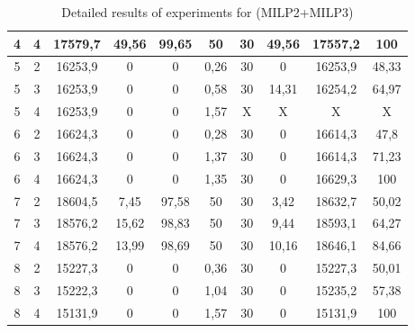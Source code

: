 \begin{table}[!ht]
\begin{tabular}{|c|c|cccc|cccc|}
\rule[-7pt]{0pt}{15pt} 
4	&	4	&	17579,7	&	49,56	&	99,65	&	50	&	30	&	49,56	&	17557,2	&	100	\\
      \hline
\rule[-7pt]{0pt}{15pt} 
5	&	2	&	16253,9	&	0	&	0	&	0,26	&	30	&	0	&	16253,9	&	48,33	\\
\rule[-7pt]{0pt}{15pt} 
5	&	3	&	16253,9	&	0	&	0	&	0,58	&	30	&	14,31	&	16254,2	&	64,97	\\
\rule[-7pt]{0pt}{15pt} 
5	&	4	&	16253,9	&	0	&	0	&	1,57	&	X	&	X	&	X	&	X	\\
      \hline
\rule[-7pt]{0pt}{15pt} 
6	&	2	&	16624,3	&	0	&	0	&	0,28	&	30	&	0	&	16614,3	&	47,8	\\
\rule[-7pt]{0pt}{15pt} 
6	&	3	&	16624,3	&	0	&	0	&	1,37	&	30	&	0	&	16614,3	&	71,23	\\
\rule[-7pt]{0pt}{15pt} 
6	&	4	&	16624,3	&	0	&	0	&	1,35	&	30	&	0	&	16629,3	&	100	\\
      \hline
\rule[-7pt]{0pt}{15pt} 
7	&	2	&	18604,5	&	7,45	&	97,58	&	50	&	30	&	3,42	&	18632,7	&	50,02	\\
\rule[-7pt]{0pt}{15pt} 
7	&	3	&	18576,2	&	15,62	&	98,83	&	50	&	30	&	9,44	&	18593,1	&	64,27	\\
\rule[-7pt]{0pt}{15pt} 
7	&	4	&	18576,2	&	13,99	&	98,69	&	50	&	30	&	10,16	&	18646,1	&	84,66	\\
      \hline
\rule[-7pt]{0pt}{15pt} 
8	&	2	&	15227,3	&	0	&	0	&	0,36	&	30	&	0	&	15227,3	&	50,01	\\
\rule[-7pt]{0pt}{15pt} 
8	&	3	&	15222,3	&	0	&	0	&	1,04	&	30	&	0	&	15235,2	&	57,38	\\
\rule[-7pt]{0pt}{15pt} 
8	&	4	&	15131,9	&	0	&	0
                         &	1,57	&	30	&	0
                                                  &	15131,9	&
                                                                  100
      \\
\hline
    \end{tabular}
\centering
~

  \caption{Detailed results of experiments for (MILP2+MILP3)}
  \label{table3}
\end{table}

